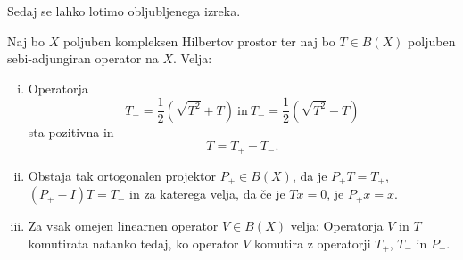 \documentclass[12pt,a4paper,oneside,fleqn,openany]{book}
\begin{document}
Sedaj se lahko lotimo obljubljenega izreka.

\begin{izrek}
	\label{izr:sebiadjrazlpoz}
	Naj bo $X$ poljuben kompleksen Hilbertov prostor ter naj bo $T\in B(X)$ poljuben sebi-adjungiran operator na $X$. Velja: \begin{enumerate}[i)]
		\item Operatorja $$ T_+ = \frac{1}{2}(\sqrt{T^2}+T)~\text{in}~T_-=\frac{1}{2}(\sqrt{T^2}-T)$$ sta pozitivna in $$T = T_+ - T_-.$$
		\item Obstaja tak ortogonalen projektor $P_+\in B(X)$, da je $P_+T=T_+$, $(P_+ - I)T=T_-$ in za katerega velja, da če je $Tx=0$, je $P_+x=x$.
		\item Za vsak omejen linearnen operator $V\in B(X)$ velja: Operatorja $V$ in $T$ komutirata natanko tedaj, ko operator $V$ komutira z operatorji $T_+$, $T_-$ in $P_+$.
	\end{enumerate}
\end{izrek}
\end{document}

